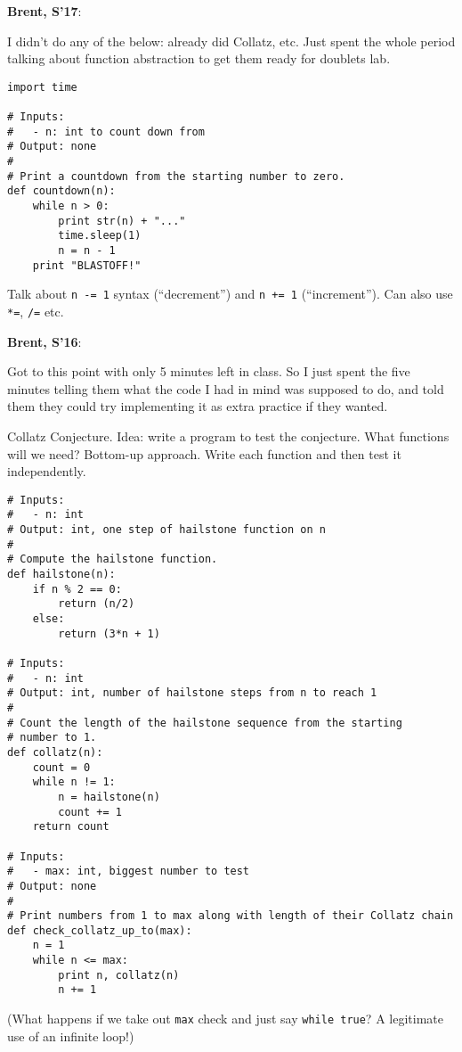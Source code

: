 \documentclass{article}
\newenvironment{reflect}[1]
{
  \noindent
  \begin{lrbox}{\reflectbox}
    \begin{minipage}[t]{\textwidth}
      \textbf{#1}:
}{
    \end{minipage}
  \end{lrbox}
  \fbox{\usebox{\reflectbox}}
}
\begin{document}
\begin{reflect}{Brent, S'17}
  I didn't do any of the below: already did Collatz, etc.  Just spent
  the whole period talking about function abstraction to get them
  ready for doublets lab.
\end{reflect}

\begin{verbatim}
import time

# Inputs:
#   - n: int to count down from
# Output: none
#
# Print a countdown from the starting number to zero.
def countdown(n):
    while n > 0:
        print str(n) + "..."
        time.sleep(1)
        n = n - 1
    print "BLASTOFF!"
\end{verbatim}

Talk about \verb|n -= 1| syntax (``decrement'') and \verb|n += 1|
(``increment'').  Can also use \verb|*=|, \verb|/=| etc.

\begin{reflect}{Brent, S'16}
  Got to this point with only 5 minutes left in class.  So I just
  spent the five minutes telling them what the code I had in mind was
  supposed to do, and told them they could try implementing it as
  extra practice if they wanted.
\end{reflect}

Collatz Conjecture.  Idea: write a program to test the conjecture.
What functions will we need?  Bottom-up approach.  Write each function
and then test it independently.
\begin{verbatim}
# Inputs:
#   - n: int
# Output: int, one step of hailstone function on n
#
# Compute the hailstone function.
def hailstone(n):
    if n % 2 == 0:
        return (n/2)
    else:
        return (3*n + 1)

# Inputs:
#   - n: int
# Output: int, number of hailstone steps from n to reach 1
#
# Count the length of the hailstone sequence from the starting
# number to 1.
def collatz(n):
    count = 0
    while n != 1:
        n = hailstone(n)
        count += 1
    return count

# Inputs:
#   - max: int, biggest number to test
# Output: none
#
# Print numbers from 1 to max along with length of their Collatz chain
def check_collatz_up_to(max):
    n = 1
    while n <= max:
        print n, collatz(n)
        n += 1
\end{verbatim}

(What happens if we take out \verb|max| check and just say
\verb|while true|?  A legitimate use of an infinite loop!)
\end{document}
